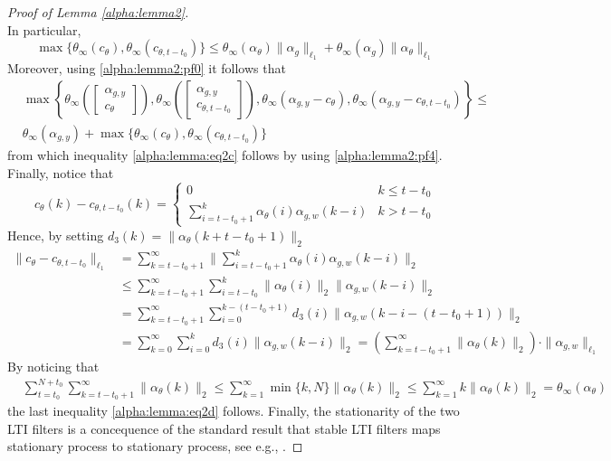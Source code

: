 \documentclass{article}
\begin{document}
\begin{proof}[Proof of Lemma  \ref{alpha:lemma2}]
\begin{equation*}
\end{equation*}
In particular, 
\begin{equation}
    \label{alpha:lemma2:pf4}
\max\{\theta_{\infty}(c_{\theta}), \theta_{\infty}(c_{\theta,t-t_0})\} \le \theta_{\infty}(\alpha_{\theta})\|\alpha_g\|_{\ell_1} +\theta_{\infty}(\alpha_{g})\|\alpha_{\theta}\|_{\ell_1}
\end{equation}
Moreover, using \eqref{alpha:lemma2:pf0} it follows that 
\begin{align*}
     & \max\left\{\theta_{\infty}\left(\begin{bmatrix} \alpha_{g,y} \\ c_{\theta} \end{bmatrix}\right),
  \theta_{\infty}\left(\begin{bmatrix} \alpha_{g,y} \\ c_{\theta,t-t_0} \end{bmatrix}\right),
\theta_{\infty}(\alpha_{g,y}-c_{\theta}), \theta_{\infty}(\alpha_{g,y}-c_{\theta,t-t_0
})\right\}  \le \\
& \theta_{\infty}(\alpha_{g,y})+\max\{\theta_{\infty}(c_{\theta}), \theta_{\infty}(c_{\theta,t-t_0})\}
\end{align*}
from which inequality \eqref{alpha:lemma:eq2c} follows by using \eqref{alpha:lemma2:pf4}. Finally, notice that 
\[
   c_{\theta}(k)-c_{\theta,t-t_0}(k)=\left\{
    \begin{array}{ll}
       0 & k \le t-t_0 \\
       \sum_{i=t-t_0+1}^{k} \alpha_{\theta}(i)\alpha_{g,w}(k-i) & k > t-t_0
   \end{array}\right.
\] 
Hence, by setting $d_3(k)=\|\alpha_{\theta}(k+t-t_0+1)\|_2$
  \begin{align*}
        \|c_{\theta}-c_{\theta,t-t_0}\|_{\ell_1}
       &=
      \sum_{k=t-t_0+1}^{\infty} \|\sum_{i=t-t_0+1}^{k} \alpha_{\theta}(i)\alpha_{g,w}(k-i)\|_2\\
       &\le  \sum_{k=t-t_0+1}^{\infty} \sum_{i=t-t_0}^{k} \|\alpha_{\theta}(i)\|_2 \|\alpha_{g,w}(k-i)\|_2\\
       &= \sum_{k=t-t_0+1}^{\infty} \sum_{i=0}^{k-(t-t_0+1)} d_3(i)
       \|\alpha_{g,w}(k-i-(t-t_0+1))\|_2 \\
       &=\sum_{k=0}^{\infty}\sum_{i=0}^{k} d_3(i)
       \|\alpha_{g,w}(k-i)\|_2=
       \left(\sum_{k=t-t_0+1}^{\infty} \|\alpha_{\theta}(k)\|_2\right) \cdot
       \|\alpha_{g,w}\|_{\ell_1}
  \end{align*}
     By noticing that 
     \[
       \begin{aligned}
        & \sum_{t=t_0}^{N+t_0} \sum_{k=t-t_0+1}^{\infty} \|\alpha_{\theta}(k)\|_2 \le
        \sum_{k=1}^{\infty} \min\{k,N\} \|\alpha_{\theta}(k)\|_2
        \le 
        \sum_{k=1}^{\infty} k \|\alpha_{\theta}(k)\|_2=\theta_{\infty}(\alpha_{\theta})
       \end{aligned}
     \]
the last inequality \eqref{alpha:lemma:eq2d} follows. Finally, the stationarity of the two LTI filters is a concequence of the standard result that stable LTI filters maps stationary process to stationary process, see e.g., \cite[Section 5.6]{gikh96}.



\end{proof}
\end{document}
